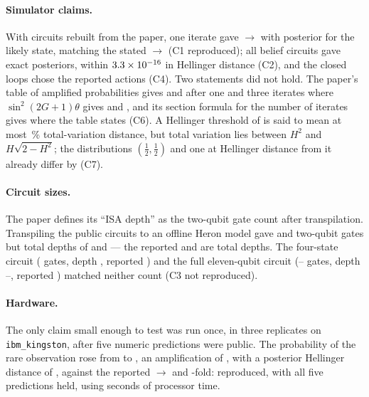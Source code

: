\documentclass[11pt,a4paper]{article}
\begin{document}
\paragraph{Simulator claims.} With circuits rebuilt from the paper, one iterate gave \PsixCOneBase{} $\to$ \PsixCOneGrover{} with posterior
\PsixCOnePostLeft{} for the likely state, matching the stated \PsixPaperTheoryBase{} $\to$ \PsixPaperTheoryGrover{} (C1 reproduced); all belief
circuits gave exact posteriors, within $3.3\times10^{-16}$ in Hellinger distance (C2), and the closed loops chose the reported actions (C4). Two
statements did not hold. The paper's table of amplified probabilities gives \PsixPaperTableOne{} and \PsixPaperTableThree{} after one and three
iterates where $\sin^2(2G{+}1)\theta$ gives \PsixCSixFormulaOne{} and \PsixCSixFormulaThree, and its section formula for the number of
iterates gives \PsixCSixSectionIterations{} where the table states \PsixPaperTableIterations{} (C6). A Hellinger threshold of \PsixPaperPass{}
is said to mean at most \PsixPaperTV\,\% total-variation distance, but total variation lies between $H^2$ and $H\sqrt{2-H^2}$; the
distributions $(\tfrac12,\tfrac12)$ and one at Hellinger distance \PsixCSevenH{} from it already differ by \PsixCSevenTV{} (C7).

\paragraph{Circuit sizes.} The paper defines its ``ISA depth'' as the two-qubit gate count after transpilation. Transpiling the public circuits
to an offline Heron model gave \PsixCThreeListenCZ{} and \PsixCThreeGroverCZ{} two-qubit gates but total depths of \PsixCThreeListenDepth{}
and \PsixCThreeGroverDepth{} --- the reported \PsixPaperISAListen{} and \PsixPaperISAGrover{} are total depths. The four-state circuit
(\PsixCThreeFourCZ{} gates, depth \PsixCThreeFourDepth, reported \PsixPaperISAFour) and the full eleven-qubit circuit (\PsixCThreeFullCZMin--\PsixCThreeFullCZMax{}
gates, depth \PsixCThreeFullDepthMin--\PsixCThreeFullDepthMax, reported \PsixPaperISAFull) matched neither count (C3 not reproduced).

\paragraph{Hardware.} The only claim small enough to test was run once, in three replicates on \texttt{ibm\_kingston}, after five numeric
predictions were public. The probability of the rare observation rose from \PsixHwBase{} to \PsixHwGrover, an amplification of \PsixHwAmp,
with a posterior Hellinger distance of \PsixHwHellinger{}, against the reported \PsixPaperBase{} $\to$ \PsixPaperGrover{} and
\PsixPaperAmp-fold: reproduced, with all five predictions held, using \PsixHwUsage{} seconds of processor time.
\end{document}
